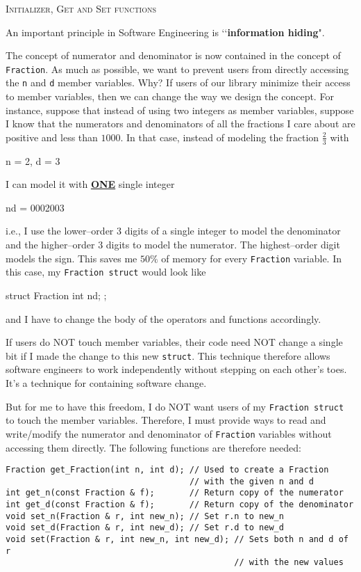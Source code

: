 
\textsc{Initializer, Get and Set functions}

An important principle in Software Engineering is \lq\lq \textbf{information hiding}".

The concept of numerator and denominator is now contained in the concept of
\verb!Fraction!. As much as possible, we want to prevent users from directly
accessing the \verb!n! and \verb!d! member variables. Why? If users of our
library minimize their access to member variables, then we can change the way
we design the concept. For instance, suppose that instead of using two integers
as member variables, suppose I know that the numerators and denominators of all
the fractions I care about are positive and less than $1000$. In that case,
instead of modeling the fraction $\frac{2}{3}$ with
\begin{console}
n = 2, d = 3
\end{console}
I can model it with \textbf{\underline{ONE}} single integer
\begin{console}
nd = 0002003
\end{console}
i.e., I use the lower--order $3$ digits of a single integer to model the
denominator and the higher--order $3$ digits to model the numerator. The
highest--order digit models the sign. This saves me $50\%$ of memory for every
\verb!Fraction! variable. In this case, my \verb!Fraction struct! would look like
\begin{console}
struct Fraction
{
    int nd;
};
\end{console}
and I have to change the body of the operators and functions accordingly.

If users do NOT touch member variables, their code need NOT change a single bit
if I made the change to this new \verb!struct!. This technique therefore allows
software engineers to work independently without stepping on each other's toes.
It's a technique for containing software change.

But for me to have this freedom, I do NOT want users of my
\verb!Fraction struct! to touch the member variables. Therefore, I must provide
ways to read and write/modify the numerator and denominator of \verb!Fraction!
variables without accessing them directly. The following functions are
therefore needed:
\begin{Verbatim}[frame=single]
Fraction get_Fraction(int n, int d); // Used to create a Fraction
                                     // with the given n and d
int get_n(const Fraction & f);       // Return copy of the numerator
int get_d(const Fraction & f);       // Return copy of the denominator
void set_n(Fraction & r, int new_n); // Set r.n to new_n
void set_d(Fraction & r, int new_d); // Set r.d to new_d
void set(Fraction & r, int new_n, int new_d); // Sets both n and d of r
                                              // with the new values
\end{Verbatim}

